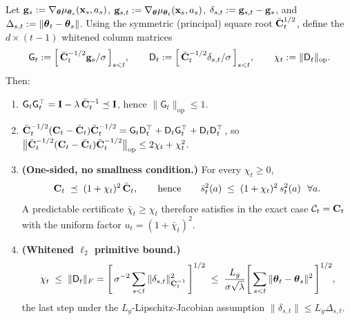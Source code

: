 \documentclass[twoside]{article}
\newcommand{\Calg}{\mathcal{C}}                 %
\newcommand{\Gmat}{\mathsf{G}}                  %
\newcommand{\Dmat}{\mathsf{D}}                  %
\begin{document}
\begin{lemma}\label{lem:whitened}
Let $\mathbf{g}_s := \nabla_{\boldsymbol{\theta}}\mu_{\boldsymbol{\theta}_s}(\mathbf{x}_s,a_s)$,
$\mathbf{g}_{s,t}:=\nabla_{\boldsymbol{\theta}}\mu_{\boldsymbol{\theta}_t}(\mathbf{x}_s,a_s)$,
$\delta_{s,t}:=\mathbf{g}_{s,t}-\mathbf{g}_s$, and
$\Delta_{s,t}:=\|\boldsymbol{\theta}_t-\boldsymbol{\theta}_s\|$.
Using the symmetric (principal) square root $\bar{\mathbf{C}}_t^{1/2}$, define the
$d\times(t{-}1)$ whitened column matrices
\begin{equation}\label{eq:whitened-cols}
  \Gmat_t := \Bigl[\,\bCbar_t^{-1/2}\bg_s/\sigma\,\Bigr]_{s<t},
  \qquad
  \Dmat_t := \Bigl[\,\bCbar_t^{-1/2}\delta_{s,t}/\sigma\,\Bigr]_{s<t},
  \qquad
  \chi_t := \|\Dmat_t\|_{\mathrm{op}} .
\end{equation}
Then:
\begin{enumerate}[nosep,label=(\alph*),leftmargin=1.6em]
\item $\Gmat_t\Gmat_t^\top = \bI - \lambda\,\bCbar_t^{-1} \preceq \bI$,
  hence $\|\Gmat_t\|_{\mathrm{op}}\le 1$.
\item $\bCbar_t^{-1/2}(\bC_t-\bCbar_t)\bCbar_t^{-1/2}
  = \Gmat_t\Dmat_t^\top + \Dmat_t\Gmat_t^\top + \Dmat_t\Dmat_t^\top$,
  so $\bigl\|\bar{\mathbf{C}}_t^{-1/2}(\mathbf{C}_t-\bar{\mathbf{C}}_t)\bar{\mathbf{C}}_t^{-1/2}\bigr\|_{\mathrm{op}}
  \le 2\chi_t + \chi_t^2$.
\item \textbf{(One-sided, no smallness condition.)} For every $\chi_t\ge0$,
  \begin{equation}\label{eq:onesided-C}
    \mathbf{C}_t \;\preceq\; (1+\chi_t)^2\,\bar{\mathbf{C}}_t,
    \qquad\text{hence}\qquad
    \bar s_t^2(a)\;\le\;(1+\chi_t)^2\,s_t^2(a)\ \ \forall a.
  \end{equation}
  A predictable certificate $\bar\chi_t\ge\chi_t$ therefore satisfies
   in the exact case $\Calg_t=\bC_t$ with the uniform
  factor $u_t=(1+\bar\chi_t)^2$.
\item \textbf{(Whitened $\ell_2$ primitive bound.)}
  \begin{equation}\label{eq:chi-primitive}
    \chi_t \;\le\; \|\Dmat_t\|_F
    = \Biggl[\,\sigma^{-2}\sum_{s<t}\|\delta_{s,t}\|_{\bCbar_t^{-1}}^2\,\Biggr]^{1/2}
    \;\le\;
    \frac{L_g}{\sigma\sqrt{\lambda}}
    \Biggl[\,\sum_{s<t}\|\btheta_t-\btheta_s\|^2\,\Biggr]^{1/2},
  \end{equation}
  the last step under the $L_g$-Lipschitz-Jacobian assumption
  $\|\delta_{s,t}\|\le L_g\Delta_{s,t}$.
\end{enumerate}
\end{lemma}
\end{document}
